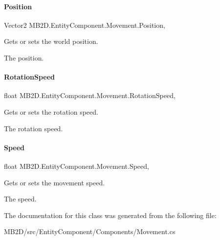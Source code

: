 \paragraph{\texorpdfstring{Position}{Position}}
{\footnotesize\ttfamily Vector2 M\+B2\+D.\+Entity\+Component.\+Movement.\+Position\hspace{0.3cm}{\ttfamily [get]}, {\ttfamily [set]}}



Gets or sets the world position. 

The position.\hypertarget{class_m_b2_d_1_1_entity_component_1_1_movement_ae46e6d4afde985b6afe55b83ae1297a3}{}\label{class_m_b2_d_1_1_entity_component_1_1_movement_ae46e6d4afde985b6afe55b83ae1297a3} 
\paragraph{\texorpdfstring{Rotation\+Speed}{RotationSpeed}}
{\footnotesize\ttfamily float M\+B2\+D.\+Entity\+Component.\+Movement.\+Rotation\+Speed\hspace{0.3cm}{\ttfamily [get]}, {\ttfamily [set]}}



Gets or sets the rotation speed. 

The rotation speed.\hypertarget{class_m_b2_d_1_1_entity_component_1_1_movement_aef220a1d502b303764058f3d11517bdf}{}\label{class_m_b2_d_1_1_entity_component_1_1_movement_aef220a1d502b303764058f3d11517bdf} 
\paragraph{\texorpdfstring{Speed}{Speed}}
{\footnotesize\ttfamily float M\+B2\+D.\+Entity\+Component.\+Movement.\+Speed\hspace{0.3cm}{\ttfamily [get]}, {\ttfamily [set]}}



Gets or sets the movement speed. 

The speed.

The documentation for this class was generated from the following file\+:\begin{DoxyCompactItemize}
\item 
M\+B2\+D/src/\+Entity\+Component/\+Components/Movement.\+cs\end{DoxyCompactItemize}
